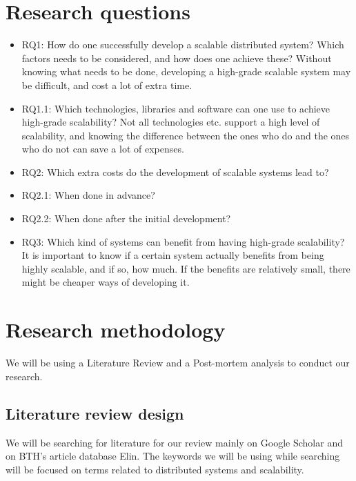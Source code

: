 \documentclass{article}
\begin{document}
\newpage

\section{Research questions}

\begin{itemize}
\item{RQ1: How do one successfully develop a scalable distributed system? Which
factors needs to be considered, and how does one achieve these? Without knowing
what needs to be done, developing a high-grade scalable system may be
difficult, and cost a lot of extra time.} 

\item{RQ1.1: Which technologies, libraries and software can one use to achieve
high-grade scalability? Not all technologies etc. support a high level of
scalability, and knowing the difference between the ones who do and the ones
who do not can save a lot of expenses.}

\item{RQ2: Which extra costs do the development of scalable systems lead to?} 
\item{RQ2.1: When done in advance?} 
\item{RQ2.2: When done after the initial development?} 

\item{RQ3: Which kind of systems can benefit from having high-grade scalability?
It is important to know if a certain system actually benefits from being highly
scalable, and if so, how much. If the benefits are relatively small, there 
might be cheaper ways of developing it.}


\end{itemize}

\section{Research methodology}

We will be using a Literature Review and a Post-mortem analysis to conduct our 
research. 

\subsection{Literature review design}

We will be searching for literature for our review mainly on Google Scholar and
on BTH's article database Elin. The keywords we will be using while searching 
will be focused on terms related to distributed systems and scalability.
\end{document}
